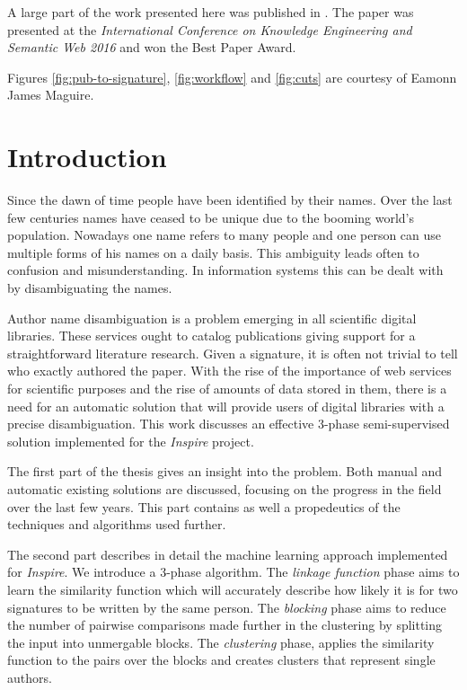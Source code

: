 \documentclass{pracamgr}
\begin{document}
A large part of the work presented here was published in \citep{Louppe}. The paper
was presented at the \textit{International Conference on Knowledge
Engineering and Semantic Web 2016} and won the Best Paper Award.

Figures \ref{fig:pub-to-signature}, \ref{fig:workflow} and \ref{fig:cuts} are
courtesy of Eamonn James Maguire.

\tableofcontents

\chapter*{Introduction}

Since the dawn of time people have been identified by their names. Over the last few
centuries names have ceased to be unique due to the booming world's population. Nowadays
one name refers to many people and one person can use multiple forms of his names on a
daily basis. This ambiguity leads often to confusion and misunderstanding. In information
systems this can be dealt with by disambiguating the names.

Author name disambiguation is a problem emerging in all scientific digital libraries.
These services ought to catalog publications giving support for a straightforward
literature research. Given a signature, it is often not trivial to tell who exactly
authored the paper. With the rise of the importance of web services for scientific
purposes and the rise of amounts of data stored in them, there is a need for an automatic
solution that will provide users of digital libraries with a precise disambiguation. This
work discusses an effective 3-phase semi-supervised solution implemented for the \textit{Inspire} project.

The first part of the thesis gives an insight into the problem. Both manual and automatic
existing solutions are discussed, focusing on the progress in the field over the last few
years. This part contains as well a propedeutics of the techniques and algorithms used
further.

The second part describes in detail the machine learning approach implemented for
\textit{Inspire}. We introduce a 3-phase algorithm. The \textit{linkage function} phase
aims to learn the similarity function which will accurately describe how likely it is for
two signatures to be written by the same person. The \textit{blocking} phase aims to reduce
the number of pairwise comparisons made further in the clustering by splitting the input
into unmergable blocks. The \textit{clustering}
phase, applies the similarity function to the pairs over the blocks and creates clusters
that represent single authors.
\end{document}
